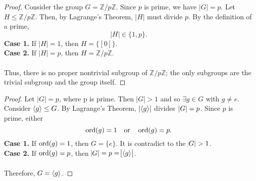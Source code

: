 \documentclass[11pt,openany]{article}
\begin{document}
\begin{proof}
	Consider the group \( G = \mathbb{Z}/p\mathbb{Z} \). Since \( p \) is prime, we have $|G| = p$.
	Let \( H\leq\mathbb{Z}/p\mathbb{Z} \). Then, by Lagrange’s Theorem, \( |H| \) must divide \( p \). By the definition of a prime, \[
	|H| \in \{1, p\}.
	\]
	\textbf{Case 1.}\; If \( |H| = 1 \), then \( H = \{[0]\} \).\\
	\textbf{Case 2.}\; If \( |H| = p \), then \( H = \mathbb{Z}/p\mathbb{Z} \).\\ \ \\
	Thus, there is no proper nontrivial subgroup of \(\mathbb{Z}/p\mathbb{Z}\); the only subgroups are the trivial subgroup and the group itself.
\end{proof}
\newpage
{}
\begin{proof}
	Let $|G| = p$, where p is prime. Then $|G| > 1$ and so $\exists g\in G$ with $g\neq e$. Consider $\langle g \rangle\leq G$. By Lagrange’s Theorem,\; $\abs[0]{\langle g \rangle}$ divides $\abs[0]{G}=p$. Since 
	$p$ is prime, either \[
	\operatorname*{ord}(g)=1\quad\text{or}\quad\operatorname*{ord}(g)=p.
	\]
	\textbf{Case 1.}\; If \( \operatorname*{ord}(g) = 1 \), then \( G = \{e\}\). It is contradict to the $\abs{G}>1$.\\
	\textbf{Case 2.}\; If \( \operatorname*{ord}(g) = p \), then \( \abs{G}=p=\abs{\langle g \rangle}\).\\ \ \\
	Therefore, $G=\langle g \rangle$.
\end{proof}
\end{document}
